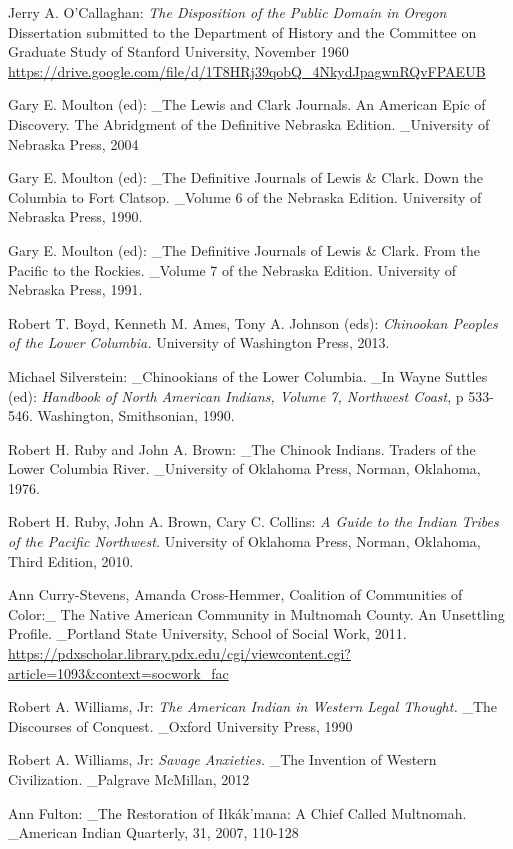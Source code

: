 \documentclass[
  12pt,
]{book}
\begin{document}
Jerry A. O'Callaghan: \emph{The Disposition of the Public Domain in Oregon}
Dissertation submitted to the Department of History and the Committee on Graduate Study of Stanford University, November 1960
\url{https://drive.google.com/file/d/1T8HRj39qobQ_4NkydJpagwnRQvFPAEUB}

Gary E. Moulton (ed): \_The Lewis and Clark Journals. An American Epic of Discovery. The Abridgment of the Definitive Nebraska Edition. \_University of Nebraska Press, 2004

Gary E. Moulton (ed): \_The Definitive Journals of Lewis \& Clark. Down the Columbia to Fort Clatsop. \_Volume 6 of the Nebraska Edition. University of Nebraska Press, 1990.

Gary E. Moulton (ed): \_The Definitive Journals of Lewis \& Clark. From the Pacific to the Rockies. \_Volume 7 of the Nebraska Edition. University of Nebraska Press, 1991.

Robert T. Boyd, Kenneth M. Ames, Tony A. Johnson (eds): \emph{Chinookan Peoples of the Lower Columbia.} University of Washington Press, 2013.

Michael Silverstein: \_Chinookians of the Lower Columbia. \_In Wayne Suttles (ed): \emph{Handbook of North American Indians, Volume 7, Northwest Coast}, p 533-546. Washington, Smithsonian, 1990.

Robert H. Ruby and John A. Brown: \_The Chinook Indians. Traders of the Lower Columbia River. \_University of Oklahoma Press, Norman, Oklahoma, 1976.

Robert H. Ruby, John A. Brown, Cary C. Collins: \emph{A Guide to the Indian Tribes of the Pacific Northwest.} University of Oklahoma Press, Norman, Oklahoma, Third Edition, 2010.

Ann Curry-Stevens, Amanda Cross-Hemmer, Coalition of Communities of Color:\_ The Native American Community in Multnomah County. An Unsettling Profile. \_Portland State University, School of Social Work, 2011. \url{https://pdxscholar.library.pdx.edu/cgi/viewcontent.cgi?article=1093\&context=socwork_fac}

Robert A. Williams, Jr: \emph{The American Indian in Western Legal Thought.} \_The Discourses of Conquest. \_Oxford University Press, 1990

Robert A. Williams, Jr: \emph{Savage Anxieties.} \_The Invention of Western Civilization. \_Palgrave McMillan, 2012

Ann Fulton: \_The Restoration of Iłkák'mana: A Chief Called Multnomah. \_American Indian Quarterly, 31, 2007, 110-128
\end{document}
